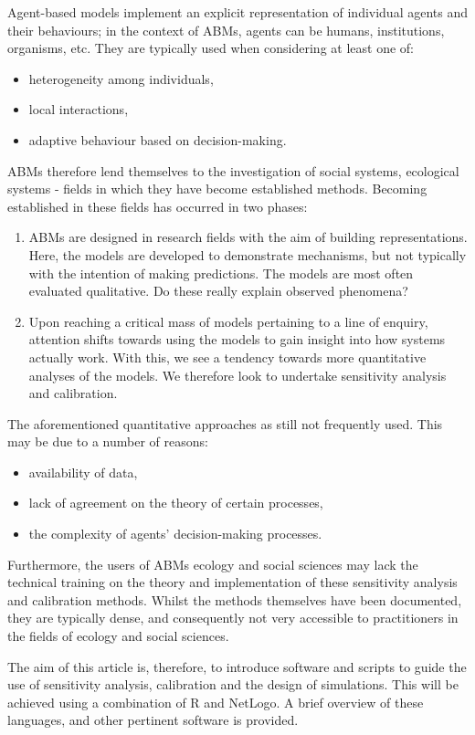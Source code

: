 Agent-based models implement an explicit representation of individual agents and their behaviours; in the context of ABMs, agents can be humans, institutions, organisms, etc.
They are typically used when considering at least one of:
\begin{itemize}
    \item heterogeneity among individuals,
    \item local interactions,
    \item adaptive behaviour based on decision-making.
\end{itemize}
ABMs therefore lend themselves to the investigation of social systems, ecological systems - fields in which they have become established methods.
Becoming established in these fields has occurred in two phases:
\begin{enumerate}
    \item ABMs are designed in research fields with the aim of building representations. 
    Here, the models are developed to demonstrate mechanisms, but not typically with the intention of making predictions.
    The models are most often evaluated qualitative.
    Do these really explain observed phenomena?
    \item Upon reaching a critical mass of models pertaining to a line of enquiry, attention shifts towards using the models to gain insight into how systems actually work.
    With this, we see a tendency towards more quantitative analyses of the models.
    We therefore look to undertake sensitivity analysis and calibration.
\end{enumerate}
The aforementioned quantitative approaches as still not frequently used.
This may be due to a number of reasons:
\begin{itemize}
    \item availability of data,
    \item lack of agreement on the theory of certain processes,
    \item the complexity of agents' decision-making processes.
\end{itemize}
Furthermore, the users of ABMs ecology and social sciences may lack the technical training on the theory and implementation of these sensitivity analysis and calibration methods.
Whilst the methods themselves have been documented, they are typically dense, and consequently not very accessible to practitioners in the fields of ecology and social sciences.

The aim of this article is, therefore, to introduce software and scripts to guide the use of sensitivity analysis, calibration and the design of simulations.
This will be achieved using a combination of R and NetLogo.
A brief overview of these languages, and other pertinent software is provided.

